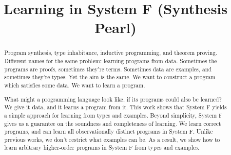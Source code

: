 \documentclass[acmsmall]{acmart}
\theoremstyle{mytheoremstyle}
\begin{document}
\title{Learning in System F (Synthesis Pearl)}



\author{}

\begin{abstract}
Program synthesis, type inhabitance, inductive programming, and theorem proving. Different names for the same problem: learning programs from data. Sometimes the programs are proofs, sometimes they’re terms. Sometimes data are examples, and sometimes they’re types. Yet the aim is the same. We want to construct a program which satisfies some data. We want to learn a program.

What might a programming language look like, if its programs could also be learned? We give it data, and it learns a program from it. This work shows that System F yields a simple approach for learning from types and examples. Beyond simplicity, System F gives us a guarantee on the soundness and completeness of learning. We learn correct programs, and can learn all observationally distinct programs in System F. Unlike previous works, we don't restrict what examples can be. As a result, we show how to learn arbitrary higher-order programs in System F from types and examples. 

\end{abstract}
\end{document}
